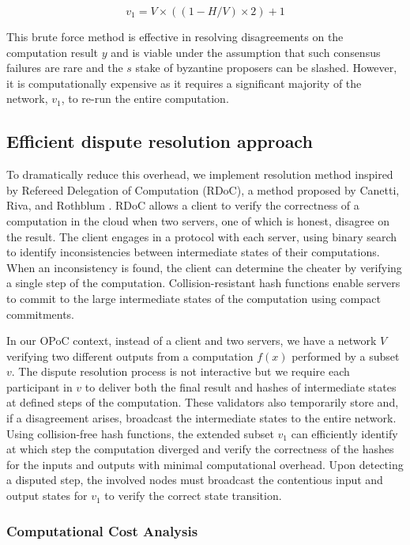 \documentclass{article}
\begin{document}
\[ v_1 = V \times \left((1 - H/V) \times 2\right) + 1 \]

This brute force method is effective in resolving disagreements on the computation result \( y \) and is viable under the assumption that such consensus failures are rare and the \(s\) stake of byzantine proposers can be slashed. However, it is computationally expensive as it requires a significant majority of the network, \( v_1 \), to re-run the entire computation.

\subsection{Efficient dispute resolution approach}

To dramatically reduce this overhead, we implement resolution method inspired by Refereed Delegation of Computation (RDoC), a method  proposed by Canetti, Riva, and Rothblum . RDoC allows a client to verify the correctness of a computation in the cloud when two servers, one of which is honest, disagree on the result. The client engages in a protocol with each server, using binary search to identify inconsistencies between intermediate states of their computations. When an inconsistency is found, the client can determine the cheater by verifying a single step of the computation. Collision-resistant hash functions enable servers to commit to the large intermediate states of the computation using compact commitments.

In our OPoC context, instead of a client and two servers, we have a network \( V \) verifying two different outputs from a computation \( f(x) \) performed by a subset \( v \). The dispute resolution process is not interactive but we require each participant in \( v \) to deliver both the final result and hashes of intermediate states at defined steps of the computation. These validators also temporarily store and, if a disagreement arises, broadcast the intermediate states to the entire network. Using collision-free hash functions, the extended subset \( v_1 \) can efficiently identify at which step the computation diverged and verify the correctness of the hashes for the inputs and outputs with minimal computational overhead. Upon detecting a disputed step, the involved nodes must broadcast the contentious input and output states for \( v_1 \) to verify the correct state transition.

\subsubsection{Computational Cost Analysis}
\end{document}
